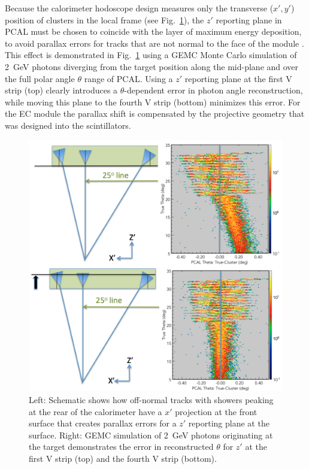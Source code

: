 Because the calorimeter hodoscope design measures only the transverse ($x',y'$) position of clusters in the local
frame (see Fig.~\ref{fig:S6_1}), the $z'$ reporting plane in PCAL must be chosen to coincide with the layer of
maximum energy deposition, to avoid parallax errors for tracks that are not normal to the face of the module
\cite{nima2018}. This effect is demonstrated in Fig.~\ref{fig:S6_1} using a GEMC Monte Carlo simulation
\cite{nim:sim} of 2~GeV photons diverging from the target position along the mid-plane and over the full polar
angle $\theta$ range of PCAL. Using a $z'$ reporting plane at the first V strip (top) clearly introduces a
$\theta$-dependent error in photon angle reconstruction, while moving this plane to the fourth V strip (bottom)
minimizes this error. For the EC module the parallax shift is compensated by the projective geometry that was
designed into the scintillators.    

\begin{figure}[hbt]
\centering
\includegraphics[width=0.95\columnwidth,keepaspectratio]{img/S6_1.png}
\caption{Left: Schematic shows how off-normal tracks with showers peaking at the rear of the calorimeter have
  a $x'$ projection at the front surface that creates parallax errors for a $z'$ reporting plane at the surface.
  Right: GEMC simulation of 2~GeV photons originating at the target demonstrates the error in reconstructed
  $\theta$ for $z'$ at the first V strip (top) and the fourth V strip (bottom).}
\label{fig:S6_1}
\end{figure}


